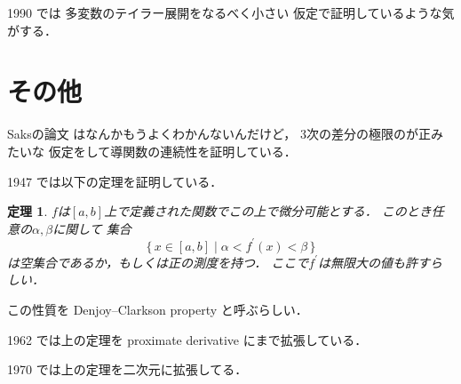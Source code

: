 \documentclass[leqno, a4paper, 12pt]{jsarticle}
\newtheorem{thm}{定理}
\begin{document}
1990
\cite{MR1096374}
では
多変数のテイラー展開をなるべく小さい
仮定で証明しているような気がする．

\section{その他}
Saksの論文
\cite{MR1574835}
はなんかもうよくわかんないんだけど，
3次の差分の極限のが正みたいな
仮定をして導関数の連続性を証明している．


1947
\cite{MR0019712}では以下の定理を証明している．
\begin{thm}
$f$は$[a, b]$上で定義された関数でこの上で微分可能とする．
このとき任意の$\alpha, \beta$に関して
集合
\[
\{\, x\in [a, b]\mid \alpha<f^{\prime}(x)<\beta\, \}
\]
は空集合であるか，もしくは正の測度を持つ．
ここで$f^{\prime}$は無限大の値も許すらしい．
\end{thm}
この性質を
Denjoy--Clarkson property 
と呼ぶらしい．

1962 
\cite{MR0151558}
では上の定理を
proximate derivative
にまで拡張している．


1970
\cite{MR0259040}
では上の定理を二次元に拡張してる．

\nocite{*}


\end{document}

